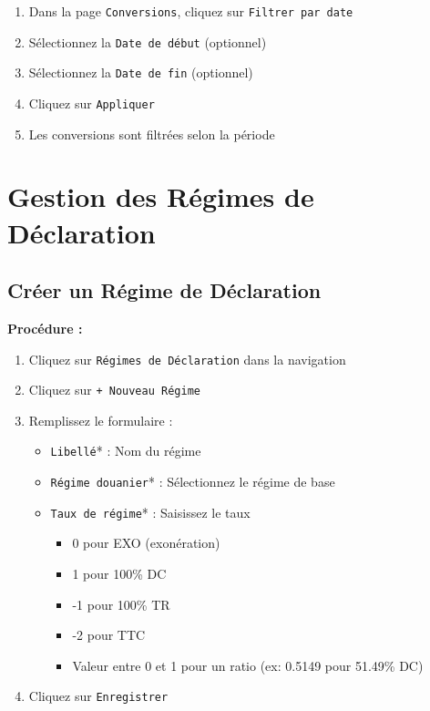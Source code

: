 \documentclass[12pt,a4paper]{report}
\begin{document}
\begin{enumerate}[leftmargin=*]
    \item Dans la page \texttt{Conversions}, cliquez sur \texttt{Filtrer par date}
    \item Sélectionnez la \texttt{Date de début} (optionnel)
    \item Sélectionnez la \texttt{Date de fin} (optionnel)
    \item Cliquez sur \texttt{Appliquer}
    \item Les conversions sont filtrées selon la période
\end{enumerate}

\section{Gestion des Régimes de Déclaration}

\subsection{Créer un Régime de Déclaration}

\textbf{Procédure :}

\begin{enumerate}[leftmargin=*]
    \item Cliquez sur \texttt{Régimes de Déclaration} dans la navigation
    \item Cliquez sur \texttt{+ Nouveau Régime}
    \item Remplissez le formulaire :
    \begin{itemize}
        \item \texttt{Libellé}* : Nom du régime
        \item \texttt{Régime douanier}* : Sélectionnez le régime de base
        \item \texttt{Taux de régime}* : Saisissez le taux
        \begin{itemize}
            \item 0 pour EXO (exonération)
            \item 1 pour 100\% DC
            \item -1 pour 100\% TR
            \item -2 pour TTC
            \item Valeur entre 0 et 1 pour un ratio (ex: 0.5149 pour 51.49\% DC)
        \end{itemize}
    \end{itemize}
    \item Cliquez sur \texttt{Enregistrer}
\end{enumerate}
\end{document}
